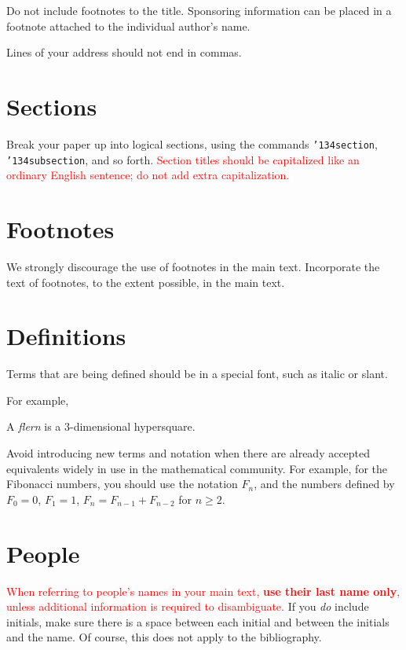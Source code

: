 \documentclass[12pt]{article}
\begin{document}
Do not include footnotes to the title.  Sponsoring information can be
placed in a footnote attached to the individual author's name.

Lines of your address should not end in commas.

\section{Sections}

Break your paper up into logical sections, using the commands
{\tt \char'134section}, {\tt \char'134subsection}, and so forth.
\textcolor{red}{Section titles should
be capitalized like an ordinary English sentence; do not add extra
capitalization.}

\section{Footnotes}

We strongly
discourage the use of footnotes in the main text.  Incorporate the text of footnotes, to the
extent possible, in the main text.

\section{Definitions}

Terms that are being defined should be in a special font, such as italic
or slant. 

For example,

\centerline{A {\it flern} is a 3-dimensional hypersquare.}

Avoid introducing new terms and notation when there are already accepted
equivalents widely in use in the mathematical community.
For example, for the Fibonacci numbers, you
should use the notation $F_n$, and the numbers defined by
$F_0 = 0$, $F_1 = 1$, $F_n = F_{n-1} + F_{n-2}$ for $n \geq 2$.

\section{People}

\textcolor{red}{When referring to people's names in your main text, \textbf{use their last name only}, unless additional
information is required to disambiguate.}  If you {\it do\/} include initials,
make sure there is a space between each initial and between the initials
and the name.   Of course, this does not apply to the bibliography.
\end{document}
